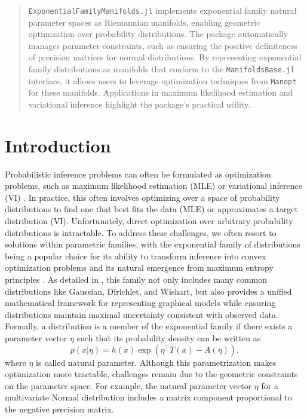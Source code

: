 \documentclass{juliacon}
\begin{document}


\maketitle
\begin{abstract}
\texttt{ExponentialFamilyManifolds.jl} implements exponential family natural parameter spaces as Riemannian manifolds, enabling geometric optimization over probability distributions. The package automatically manages parameter constraints, such as ensuring the positive definiteness of precision matrices for normal distributions. By representing exponential family distributions as manifolds that conform to the \texttt{ManifoldsBase.jl} interface, it allows users to leverage optimization techniques from \texttt{Manopt} for these manifolds. Applications in maximum likelihood estimation and variational inference highlight the package's practical utility.
\end{abstract}

\section{Introduction}

Probabilistic inference problems can often be formulated as optimization problems, such as maximum likelihood estimation (MLE) or variational inference (VI) \cite{blei_variational_2017}. In practice, this often involves optimizing over a space of probability distributions to find one that best fits the data (MLE) or approximates a target distribution (VI). Unfortunately, direct optimization over arbitrary probability distributions is intractable. To address these challenges, we often resort to solutions within parametric families, with the exponential family of distributions being a popular choice for its ability to transform inference into convex optimization problems and its natural emergence from maximum entropy principles \cite{wainwright_graphical_2008}. As detailed in \cite[Chapter~3]{wainwright_graphical_2008}, this family not only includes many common distributions like Gaussian, Dirichlet, and Wishart, but also provides a unified mathematical framework for representing graphical models while ensuring distributions maintain maximal uncertainty consistent with observed data. Formally, a distribution is a member of the exponential family if there exists a parameter vector $\eta$ such that its probability density can be written as
\begin{equation*}\label{eq:exponential-family}
p(x|\eta) = h(x)\exp\left(\eta^\top T(x) - A(\eta)\right),
\end{equation*}
where $\eta$ is called natural parameter. Although this parametrization makes optimization more tractable, challenges remain due to the geometric constraints on the parameter space. For example, the natural parameter vector $\eta$ for a multivariate Normal distribution includes a matrix component proportional to the negative precision matrix.
\end{document}
